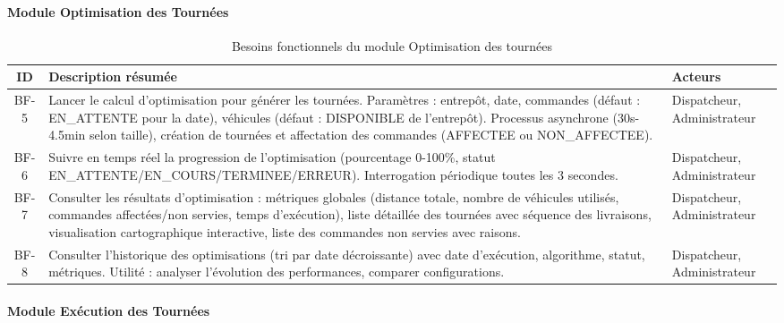 \documentclass[12pt,a4paper]{report}
\begin{document}
\paragraph{Module Optimisation des Tournées}

\begin{table}[H]
\centering
\footnotesize
\begin{tabular}{|c|p{7.5cm}|p{4cm}|}
\hline
\textbf{ID} & \textbf{Description résumée} & \textbf{Acteurs} \\
\hline
BF-5 & Lancer le calcul d'optimisation pour générer les tournées. Paramètres : entrepôt, date, commandes (défaut : EN\_ATTENTE pour la date), véhicules (défaut : DISPONIBLE de l'entrepôt). Processus asynchrone (30s-4.5min selon taille), création de tournées et affectation des commandes (AFFECTEE ou NON\_AFFECTEE). & Dispatcheur, Administrateur \\
\hline
BF-6 & Suivre en temps réel la progression de l'optimisation (pourcentage 0-100\%, statut EN\_ATTENTE/EN\_COURS/TERMINEE/ERREUR). Interrogation périodique toutes les 3 secondes. & Dispatcheur, Administrateur \\
\hline
BF-7 & Consulter les résultats d'optimisation : métriques globales (distance totale, nombre de véhicules utilisés, commandes affectées/non servies, temps d'exécution), liste détaillée des tournées avec séquence des livraisons, visualisation cartographique interactive, liste des commandes non servies avec raisons. & Dispatcheur, Administrateur \\
\hline
BF-8 & Consulter l'historique des optimisations (tri par date décroissante) avec date d'exécution, algorithme, statut, métriques. Utilité : analyser l'évolution des performances, comparer configurations. & Dispatcheur, Administrateur \\
\hline
\end{tabular}
\caption{Besoins fonctionnels du module Optimisation des tournées}
\label{tab:bf-optimisation}
\end{table}

\paragraph{Module Exécution des Tournées}
\end{document}
